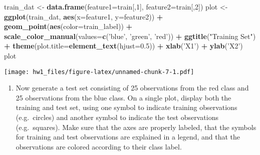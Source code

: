 \documentclass[]{article}
\newenvironment{Shaded}{\begin{snugshade}}{\end{snugshade}}
\newcommand{\DataTypeTok}[1]{\textcolor[rgb]{0.13,0.29,0.53}{#1}}
\newcommand{\DecValTok}[1]{\textcolor[rgb]{0.00,0.00,0.81}{#1}}
\newcommand{\FloatTok}[1]{\textcolor[rgb]{0.00,0.00,0.81}{#1}}
\newcommand{\KeywordTok}[1]{\textcolor[rgb]{0.13,0.29,0.53}{\textbf{#1}}}
\newcommand{\NormalTok}[1]{#1}
\newcommand{\OperatorTok}[1]{\textcolor[rgb]{0.81,0.36,0.00}{\textbf{#1}}}
\newcommand{\StringTok}[1]{\textcolor[rgb]{0.31,0.60,0.02}{#1}}
\providecommand{\tightlist}{%
  \setlength{\itemsep}{0pt}\setlength{\parskip}{0pt}}
\begin{document}
\begin{Shaded}
\begin{Highlighting}[]
\NormalTok{train_dat <-}\StringTok{ }\KeywordTok{data.frame}\NormalTok{(}\DataTypeTok{feature1=}\NormalTok{train[,}\DecValTok{1}\NormalTok{], }\DataTypeTok{feature2=}\NormalTok{train[,}\DecValTok{2}\NormalTok{])}
\NormalTok{plot <-}\StringTok{ }\KeywordTok{ggplot}\NormalTok{(train_dat, }\KeywordTok{aes}\NormalTok{(}\DataTypeTok{x=}\NormalTok{feature1, }\DataTypeTok{y=}\NormalTok{feature2)) }\OperatorTok{+}\StringTok{ }\KeywordTok{geom_point}\NormalTok{(}\KeywordTok{aes}\NormalTok{(}\DataTypeTok{color=}\NormalTok{train_label)) }\OperatorTok{+}\StringTok{ }\KeywordTok{scale_color_manual}\NormalTok{(}\DataTypeTok{values=}\KeywordTok{c}\NormalTok{(}\StringTok{'blue'}\NormalTok{, }\StringTok{'green'}\NormalTok{, }\StringTok{'red'}\NormalTok{)) }\OperatorTok{+}\StringTok{ }\KeywordTok{ggtitle}\NormalTok{(}\StringTok{"Training Set"}\NormalTok{) }\OperatorTok{+}\StringTok{ }\KeywordTok{theme}\NormalTok{(}\DataTypeTok{plot.title=}\KeywordTok{element_text}\NormalTok{(}\DataTypeTok{hjust=}\FloatTok{0.5}\NormalTok{)) }\OperatorTok{+}\StringTok{ }\KeywordTok{xlab}\NormalTok{(}\StringTok{'X1'}\NormalTok{) }\OperatorTok{+}\StringTok{ }\KeywordTok{ylab}\NormalTok{(}\StringTok{'X2'}\NormalTok{)}
\NormalTok{plot}
\end{Highlighting}
\end{Shaded}

\texttt{[image: hw1\_files/figure-latex/unnamed-chunk-7-1.pdf]}

\begin{enumerate}
\def\labelenumi{(\alph{enumi})}
\setcounter{enumi}{1}
\tightlist
\item
  Now generate a test set consisting of 25 observations from the red
  class and 25 observations from the blue class. On a single plot,
  display both the training and test set, using one symbol to indicate
  training observations (e.g.~circles) and another symbol to indicate
  the test observations (e.g.~squares). Make sure that the axes are
  properly labeled, that the symbols for training and test observations
  are explained in a legend, and that the observations are colored
  according to their class label.
\end{enumerate}
\end{document}
